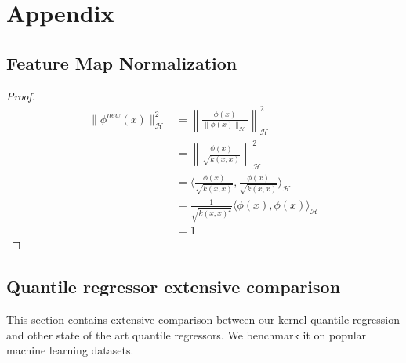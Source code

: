\chapter{Appendix}
\section{Feature Map Normalization}\label{appendix:new_feature}
\begin{proof}
\begin{align*}
    \|
    \phi^{new}(x)\|_{\mathcal{H}}^{2} &= \left\|\frac{\phi(x)}{\|\phi(x)\|_{\mathcal{H}}}
    \right\|_{\mathcal{H}}^{2}
    \\
    &=
    \left\|
    \frac{\phi(x)}
    {\sqrt{k(x,x)}}
    \right\|_{\mathcal{H}}^{2}
    \\
    &=
    \langle
    \frac{\phi(x)}
    {\sqrt{k(x,x)}}
    ,
    \frac{\phi(x)}
    {\sqrt{k(x,x)}}
    \rangle_{\mathcal{H}}
    \\
    &=
    \frac{1}{\sqrt{k(x,x)^{2}}}
    \langle
    \phi(x)
    ,
    \phi(x)
    \rangle_{\mathcal{H}}
    \\
    &=1
\end{align*}
\end{proof}



\section{Quantile regressor extensive comparison}\label{appendix:quantile_regressor_extensive_comparison}
This section contains extensive comparison between our kernel quantile regression and other state of the art quantile regressors. We benchmark it on popular machine learning datasets.
